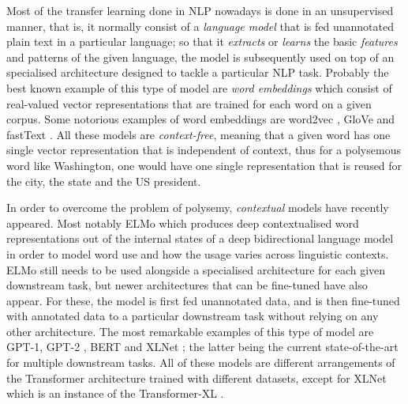 Most of the transfer learning done in NLP nowadays is done in an unsupervised manner, that is, it normally consist of a  \emph{language model} that is fed unannotated plain text in a particular language; so that it \emph{extracts} or \emph{learns} the basic \emph{features} and patterns of the given language, the model is subsequently used on top of an specialised architecture designed to tackle a particular NLP task. Probably the best known example of this type of model are \emph{word embeddings} which consist of real-valued vector representations that are trained for each word on a given corpus. Some notorious examples of word embeddings are word2vec \citep{mikolov-etal-2013-distributed}, GloVe \citep{pennington-etal-2014-glove} and \mbox{fastText} \citep{mikolov-etal-2018-advances}. All these models are \emph{context-free}, meaning that a given word has one single vector representation that is independent of context, thus for a polysemous word like Washington, one would have one single representation that is reused for the city, the state and the US president.

In order to overcome the problem of polysemy, \emph{contextual} models have recently appeared. Most notably ELMo \citep{peters-etal-2018-deep} which produces deep contextualised word representations out of the internal states of a deep bidirectional language model in order to model word use and how the usage varies across linguistic contexts. ELMo still needs to be used alongside a specialised architecture for each given downstream task, but newer architectures that can be fine-tuned have also appear. For these, the model is first fed unannotated data, and is then fine-tuned with annotated data to a particular downstream task without relying on any other architecture. The most remarkable examples of this type of model are GPT-1, GPT-2 \citep{radford-etal-2018-improving,radford-etal-2019-language}, BERT \citep{devlin-etal-2019-bert} and XLNet \citep{yang-etal-2019-xlnet}; the latter being the current state-of-the-art for multiple downstream tasks. All of these models are different arrangements of the Transformer architecture \citep{vaswani-etal-2017-attention} trained with different datasets, except for XLNet which is an instance of the Transformer-XL \citep{dai-etal-2019-transformer}.


